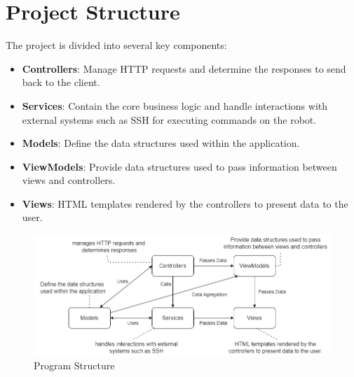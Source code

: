 \usetikzlibrary{positioning}
\section{Project Structure}
The project is divided into several key components:
\begin{itemize}
	\item \textbf{Controllers}: Manage HTTP requests and determine the responses to send back to the client.
	\item \textbf{Services}: Contain the core business logic and handle interactions with external systems such as SSH for executing commands on the robot.
	\item \textbf{Models}: Define the data structures used within the application.
	\item \textbf{ViewModels}: Provide data structures used to pass information between views and controllers.
	\item \textbf{Views}: HTML templates rendered by the controllers to present data to the user.
\end{itemize}
\begin{figure}[H]
	\centering
	\includegraphics[width=1\textwidth]{Images/ProgramStructure.png}
	\caption{Program Structure}
	\label{}
\end{figure}